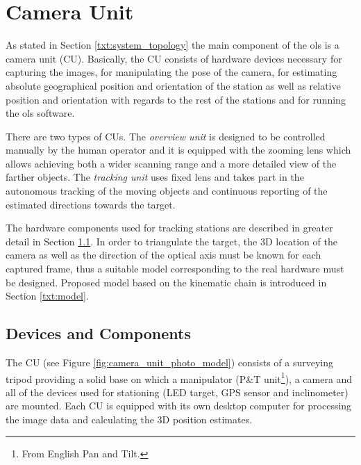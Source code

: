 \section{Camera Unit} \label{txt:camera_unit}

As stated in Section \ref{txt:system_topology} the main component of the \gls{ols} is a camera unit (CU). Basically, the CU consists of hardware devices necessary for capturing the images, for manipulating the pose of the camera, for estimating absolute geographical position and orientation of the station as well as relative position and orientation with regards to the rest of the stations and for running the \gls{ols} software.

There are two types of CUs. The \textit{overview unit} is designed to be controlled manually by the human operator and it is equipped with the zooming lens which allows achieving both a wider scanning range and a more detailed view of the farther objects. The \textit{tracking unit} uses fixed lens and takes part in the autonomous tracking of the moving objects and continuous reporting of the estimated directions towards the target.

The hardware components used for tracking stations are described in greater detail in Section \ref{txt:devices}. In order to triangulate the target, the 3D location of the camera as well as the direction of the optical axis must be known for each captured frame, thus a suitable model corresponding to the real hardware must be designed. Proposed model based on the kinematic chain is introduced in Section \ref{txt:model}.

\subsection{Devices and Components} \label{txt:devices}

The CU (see Figure \ref{fig:camera_unit_photo_model}) consists of a surveying tripod providing a solid base on which a manipulator (P\&T unit\footnote{From English Pan and Tilt.}), a camera and all of the devices used for stationing (LED target, GPS sensor and inclinometer) are mounted. Each CU is equipped with its own desktop computer for processing the image data and calculating the 3D position estimates.

